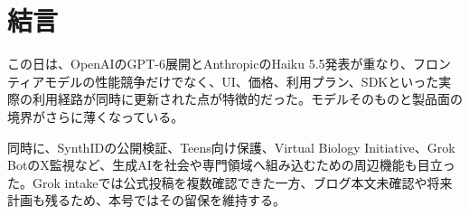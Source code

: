 \section*{結言}
この日は、OpenAIのGPT-6展開とAnthropicのHaiku 5.5発表が重なり、フロンティアモデルの性能競争だけでなく、UI、価格、利用プラン、SDKといった実際の利用経路が同時に更新された点が特徴的だった。モデルそのものと製品面の境界がさらに薄くなっている。

同時に、SynthIDの公開検証、Teens向け保護、Virtual Biology Initiative、Grok BotのX監視など、生成AIを社会や専門領域へ組み込むための周辺機能も目立った。Grok intakeでは公式投稿を複数確認できた一方、ブログ本文未確認や将来計画も残るため、本号ではその留保を維持する。

